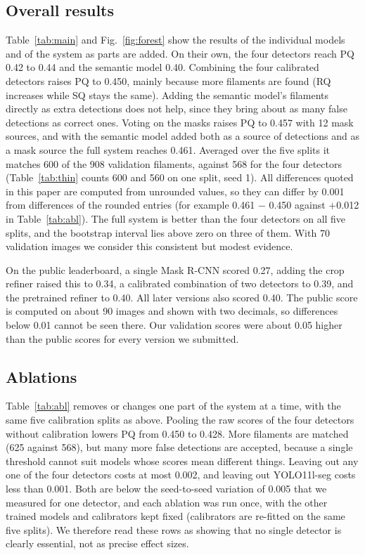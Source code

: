 \documentclass[conference]{IEEEtran}
\begin{document}
\subsection{Overall results}
Table~\ref{tab:main} and Fig.~\ref{fig:forest} show the results of the individual models and of the system as parts are added. On their own, the four detectors reach PQ 0.42 to 0.44 and the semantic model 0.40. Combining the four calibrated detectors raises PQ to 0.450, mainly because more filaments are found (RQ increases while SQ stays the same). Adding the semantic model's filaments directly as extra detections does not help, since they bring about as many false detections as correct ones. Voting on the masks raises PQ to 0.457 with 12 mask sources, and with the semantic model added both as a source of detections and as a mask source the full system reaches 0.461. Averaged over the five splits it matches 600 of the 908 validation filaments, against 568 for the four detectors (Table~\ref{tab:thin} counts 600 and 560 on one split, seed 1). All differences quoted in this paper are computed from unrounded values, so they can differ by 0.001 from differences of the rounded entries (for example 0.461 $-$ 0.450 against $+$0.012 in Table~\ref{tab:abl}). The full system is better than the four detectors on all five splits, and the bootstrap interval lies above zero on three of them. With 70 validation images we consider this consistent but modest evidence.

On the public leaderboard, a single Mask R-CNN scored 0.27, adding the crop refiner raised this to 0.34, a calibrated combination of two detectors to 0.39, and the pretrained refiner to 0.40. All later versions also scored 0.40. The public score is computed on about 90 images and shown with two decimals, so differences below 0.01 cannot be seen there. Our validation scores were about 0.05 higher than the public scores for every version we submitted.

\subsection{Ablations}
Table~\ref{tab:abl} removes or changes one part of the system at a time, with the same five calibration splits as above. Pooling the raw scores of the four detectors without calibration lowers PQ from 0.450 to 0.428. More filaments are matched (625 against 568), but many more false detections are accepted, because a single threshold cannot suit models whose scores mean different things. Leaving out any one of the four detectors costs at most 0.002, and leaving out YOLO11l-seg costs less than 0.001. Both are below the seed-to-seed variation of 0.005 that we measured for one detector, and each ablation was run once, with the other trained models and calibrators kept fixed (calibrators are re-fitted on the same five splits). We therefore read these rows as showing that no single detector is clearly essential, not as precise effect sizes.
\end{document}
